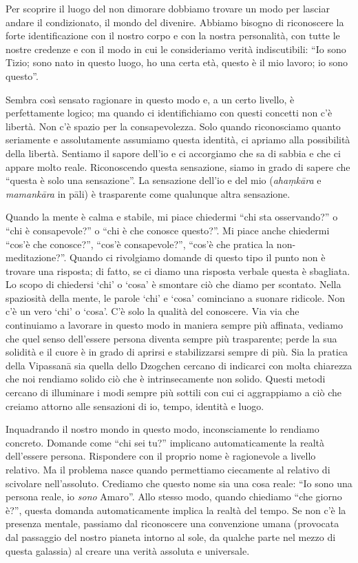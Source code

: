 Per scoprire il luogo del non dimorare dobbiamo trovare un modo per lasciar andare il condizionato, il mondo del divenire. Abbiamo bisogno di riconoscere la forte identificazione con il nostro corpo e con la nostra personalità, con tutte le nostre credenze e con il modo in cui le consideriamo verità indiscutibili: ``Io sono Tizio; sono nato in questo luogo, ho una certa età, questo è il mio lavoro; io sono questo''.

Sembra così sensato ragionare in questo modo e, a un certo livello, è perfettamente logico; ma quando ci identifichiamo con questi concetti non c'è libertà. Non c'è spazio per la consapevolezza. Solo quando riconosciamo quanto seriamente e assolutamente assumiamo questa identità, ci apriamo alla possibilità della libertà. Sentiamo il sapore dell'io e ci accorgiamo che sa di sabbia e che ci appare molto reale. Riconoscendo questa sensazione, siamo in grado di sapere che ``questa è solo una sensazione''. La sensazione dell'io e del mio (\textit{ahaṃkāra} e \textit{mamankāra} in pāli) è trasparente come qualunque altra sensazione.

Quando la mente è calma e stabile, mi piace chiedermi ``chi sta osservando?'' o ``chi è consapevole?'' o ``chi è che conosce questo?''. Mi piace anche chiedermi ``cos'è che conosce?'', ``cos'è consapevole?'', ``cos'è che pratica la non-meditazione?''. Quando ci rivolgiamo domande di questo tipo il punto non è trovare una risposta; di fatto, se ci diamo una risposta verbale questa è sbagliata. Lo scopo di chiedersi `chi' o `cosa' è smontare ciò che diamo per scontato. Nella spaziosità della mente, le parole `chi' e `cosa' cominciano a suonare ridicole. Non c'è un vero `chi' o `cosa'. C'è solo la qualità del conoscere. Via via che continuiamo a lavorare in questo modo in maniera sempre più affinata, vediamo che quel senso dell'essere persona diventa sempre più trasparente; perde la sua solidità e il cuore è in grado di aprirsi e stabilizzarsi sempre di più. Sia la pratica della Vipassanā sia quella dello Dzogchen cercano di indicarci con molta chiarezza che noi rendiamo solido ciò che è intrinsecamente non solido. Questi metodi cercano di illuminare i modi sempre più sottili con cui ci aggrappiamo a ciò che creiamo attorno alle sensazioni di io, tempo, identità e luogo.

Inquadrando il nostro mondo in questo modo, inconsciamente lo rendiamo concreto. Domande come ``chi sei tu?'' implicano automaticamente la realtà dell'essere persona. Rispondere con il proprio nome è ragionevole a livello relativo. Ma il problema nasce quando permettiamo ciecamente al relativo di scivolare nell'assoluto. Crediamo che questo nome sia una cosa reale: ``Io sono una persona reale, io \textit{sono} Amaro''. Allo stesso modo, quando chiediamo ``che giorno è?'', questa domanda automaticamente implica la realtà del tempo. Se non c'è la presenza mentale, passiamo dal riconoscere una convenzione umana (provocata dal passaggio del nostro pianeta intorno al sole, da qualche parte nel mezzo di questa galassia) al creare una verità assoluta e universale.


